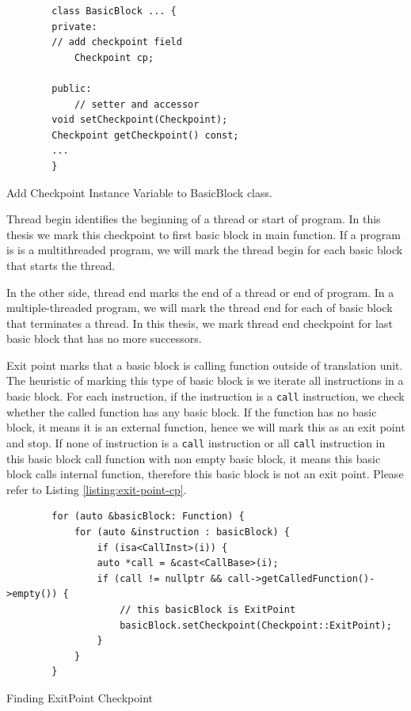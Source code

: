 \begin{listing}[htbp]
    \begin{verbatim}
        class BasicBlock ... {
        private:
        // add checkpoint field
            Checkpoint cp;

        public:
            // setter and accessor
        void setCheckpoint(Checkpoint);
        Checkpoint getCheckpoint() const;
        ...
        }
    \end{verbatim}
    \caption{Add Checkpoint Instance Variable to BasicBlock class.}    
    \label{listing:checkpoint}
\end{listing}

Thread begin identifies the beginning of a thread or start of program. In this
thesis we mark this checkpoint to first basic block in main function. If a
program is is a multithreaded program, we will mark the thread begin for each
basic block that starts the thread.

In the other side, thread end marks the end of a thread or end of program. In a
multiple-threaded program, we will mark the thread end for each of basic block
that terminates a thread. In this thesis, we mark thread end checkpoint for last
basic block that has no more successors.

Exit point marks that a basic block is calling function outside of translation
unit. The heuristic of marking this type of basic block is we iterate all
instructions in a basic block. For each instruction, if the instruction is a
\texttt{call} instruction, we check whether the called function has any basic
block. If the function has no basic block, it means it is an external function,
hence we will mark this as an exit point and stop. If none of instruction is a
\texttt{call} instruction or all \texttt{call} instruction in this basic block
call function with non empty basic block, it means this basic block calls
internal function, therefore this basic block is not an exit point. Please refer
to Listing \ref{listing:exit-point-cp}.

\begin{listing}[htbp]
    \begin{verbatim}
        for (auto &basicBlock: Function) {
            for (auto &instruction : basicBlock) {
                if (isa<CallInst>(i)) {
                auto *call = &cast<CallBase>(i);
                if (call != nullptr && call->getCalledFunction()->empty()) {
                    // this basicBlock is ExitPoint
                    basicBlock.setCheckpoint(Checkpoint::ExitPoint);
                } 
            }
        } 
    \end{verbatim}
    \caption{Finding ExitPoint Checkpoint}    
    \label{listing:exit-point-cp}
\end{listing}

